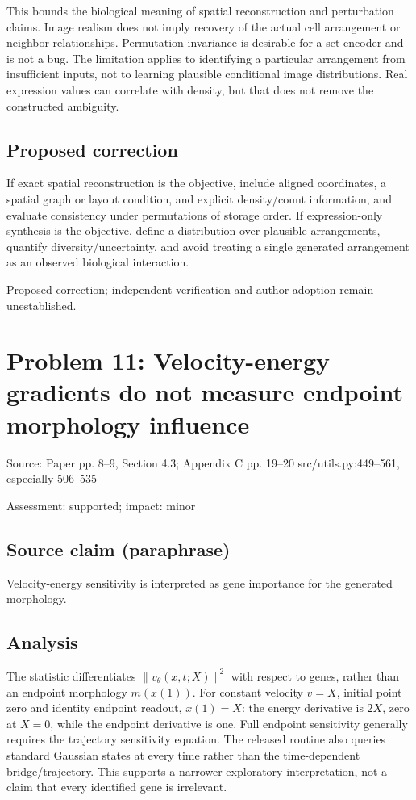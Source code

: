 \documentclass[11pt]{article}
\begin{document}
This bounds the biological meaning of spatial reconstruction and perturbation claims. Image realism does not imply recovery of the actual cell arrangement or neighbor relationships. Permutation invariance is desirable for a set encoder and is not a bug. The limitation applies to identifying a particular arrangement from insufficient inputs, not to learning plausible conditional image distributions. Real expression values can correlate with density, but that does not remove the constructed ambiguity.

\subsection*{Proposed correction}

If exact spatial reconstruction is the objective, include aligned coordinates, a spatial graph or layout condition, and explicit density/count information, and evaluate consistency under permutations of storage order. If expression-only synthesis is the objective, define a distribution over plausible arrangements, quantify diversity/uncertainty, and avoid treating a single generated arrangement as an observed biological interaction.

Proposed correction; independent verification and author adoption remain unestablished.

\section*{Problem 11: Velocity-energy gradients do not measure endpoint morphology influence}

Source: Paper pp. 8–9, Section 4.3; Appendix C pp. 19–20 src/utils.py:449–561, especially 506–535

Assessment: supported; impact: minor

\subsection*{Source claim (paraphrase)}

Velocity-energy sensitivity is interpreted as gene importance for the generated morphology.

\subsection*{Analysis}

The statistic differentiates \(\|v_\theta(x,t;X)\|^2\) with respect to genes, rather than an endpoint morphology \(m(x(1))\). For constant velocity \(v=X\), initial point zero and identity endpoint readout, \(x(1)=X\): the energy derivative is \(2X\), zero at \(X=0\), while the endpoint derivative is one. Full endpoint sensitivity generally requires the trajectory sensitivity equation. The released routine also queries standard Gaussian states at every time rather than the time-dependent bridge/trajectory. This supports a narrower exploratory interpretation, not a claim that every identified gene is irrelevant.
\end{document}
